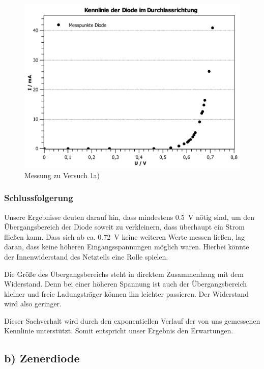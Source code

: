 \documentclass[11pt,a4paper,titlepage, ngerman]{article}
\begin{document}
				\begin{figure}
					\centering
					\includegraphics[width=\textwidth]{KennlinieDiode.pdf}
					\caption{Messung zu Versuch 1a)}
					\label{KL a}
				\end{figure}
			
			\subsubsection*{Schlussfolgerung}
							
				Unsere Ergebnisse deuten darauf hin, dass mindestens \SI{0.5}{\V} nötig sind, um den Übergangsbereich der Diode soweit zu verkleinern, dass überhaupt ein Strom fließen kann. 				
				Dass sich ab ca. \SI{0.72}{\V} keine weiteren Werte messen  ließen, lag daran, dass keine höheren Eingangsspannungen möglich waren. Hierbei könnte der Innenwiderstand des Netzteils eine Rolle spielen.

				Die Größe des Übergangsbereichs steht in direktem Zusammenhang mit dem Widerstand.
				Denn bei einer höheren Spannung ist auch der Übergangsbereich kleiner und freie Ladungsträger können ihn leichter passieren.
				Der Widerstand wird also geringer.
				
				Dieser Sachverhalt wird durch den exponentiellen Verlauf der von uns gemessenen Kennlinie unterstützt.
				Somit entspricht unser Ergebnis den Erwartungen.
				
		\subsection{b) Zenerdiode} 
			
\end{document}
